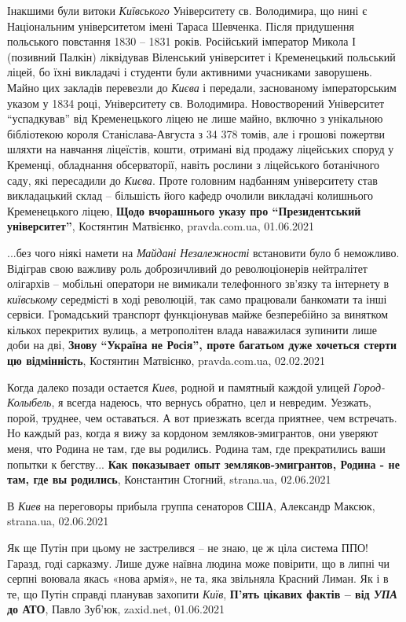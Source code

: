 Інакшими були витоки \emph{Київського} Університету св. Володимира, що нині є
Національним університетом імені Тараса Шевченка. Після придушення польського
повстання 1830 – 1831 років. Російський імператор Микола І (позивний Палкін)
ліквідував Віленський університет і Кременецький польський ліцей, бо їхні
викладачі і студенти були активними учасниками заворушень. Майно цих закладів
перевезли до \emph{Києва} і передали, заснованому імператорським указом у 1834 році,
Університету св. Володимира. Новостворений Університет \enquote{успадкував} від
Кременецького ліцею не лише майно, включно з унікальною бібліотекою короля
Станіслава-Августа з 34 378 томів, але і грошові пожертви шляхти на навчання
ліцеїстів, кошти, отримані від продажу ліцейських споруд у Кременці, обладнання
обсерваторії, навіть рослини з ліцейського ботанічного саду, які пересадили до
\emph{Києва}. Проте головним надбанням університету став викладацький склад –
більшість його кафедр очолили викладачі колишнього Кременецького ліцею,
\textbf{Щодо вчорашнього указу про \enquote{Президентський університет}}, Костянтин Матвієнко, pravda.com.ua, 01.06.2021

...без чого ніякі намети на \emph{Майдані Незалежності} встановити було б
неможливо.  Відіграв свою важливу роль доброзичливий до революціонерів
нейтралітет олігархів – мобільні оператори не вимикали телефонного зв'язку та
інтернету в \emph{київському} середмісті в ході революцій, так само працювали
банкомати та інші сервіси. Громадський транспорт функціонував майже
безперебійно за винятком кількох перекритих вулиць, а метрополітен влада
наважилася зупинити лише доби на дві,
\textbf{Знову \enquote{Україна не Росія}, проте багатьом дуже хочеться стерти цю відмінність},
Костянтин Матвієнко, pravda.com.ua, 02.02.2021

Когда далеко позади остается \emph{Киев}, родной и памятный каждой улицей
\emph{Город-Колыбель}, я всегда надеюсь, что вернусь обратно, цел и невредим.
Уезжать, порой, труднее, чем оставаться. А вот приезжать всегда приятнее, чем
встречать.  Но каждый раз, когда я вижу за кордоном земляков-эмигрантов, они
уверяют меня, что Родина не там, где вы родились. Родина там, где прекратились
ваши попытки к бегству...
\textbf{Как показывает опыт земляков-эмигрантов, Родина - не там, где вы родились},
Константин Стогний, strana.ua, 02.06.2021

В \emph{Киев} на переговоры прибыла группа сенаторов США, Александр Максюк, strana.ua, 02.06.2021

Як ще Путін при цьому не застрелився – не знаю, це ж ціла система ППО! Гаразд,
годі сарказму. Лише дуже наївна людина може повірити, що в липні чи серпні
воювала якась «нова армія», не та, яка звільняла Красний Лиман. Як і в те, що
Путін справді планував захопити \emph{Київ},
\textbf{П'ять цікавих фактів – від \emph{УПА} до АТО}, Павло Зуб'юк, zaxid.net, 01.06.2021

